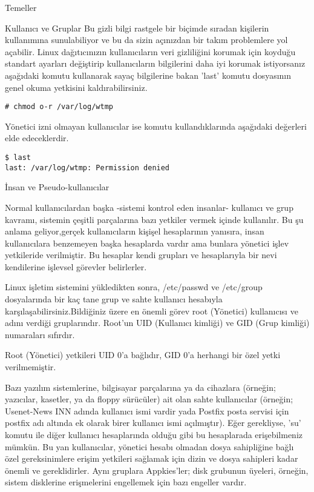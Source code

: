 \begin{section}{Temeller}
\begin{subsection}{Kullanıcı ve Gruplar}
Bu gizli bilgi rastgele bir biçimde sıradan kişilerin kullanımına sunulabiliyor ve bu da sizin açınızdan bir takım problemlere yol açabilir. Linux dağıtıcınızın kullanıcıların veri gizliliğini korumak için koyduğu standart ayarları değiştirip kullanıcıların bilgilerini daha iyi korumak istiyorsanız aşağıdaki komutu kullanarak sayaç bilgilerine bakan 'last' komutu dosyasının genel okuma yetkisini kaldırabilirsiniz.
\begin{verbatim}
# chmod o-r /var/log/wtmp
\end{verbatim}

Yönetici izni olmayan kullanıcılar ise komutu kullandıklarında aşağıdaki değerleri elde edeceklerdir.
\begin{verbatim}
$ last
last: /var/log/wtmp: Permission denied
\end{verbatim}
\end{subsection}
\begin{subsection}{İnsan ve Pseudo-kullanıcılar}

Normal kullanıcılardan başka -sistemi kontrol eden insanlar- kullanıcı ve grup kavramı, sistemin çeşitli parçalarına bazı yetkiler vermek içinde kullanılır. Bu şu anlama geliyor,gerçek kullanıcıların kişişel hesaplarının yanısıra, insan kullanıcılara benzemeyen başka hesaplarda vardır ama bunlara yönetici işlev yetkileride verilmiştir. Bu hesaplar kendi grupları ve hesaplarıyla bir nevi kendilerine işlevsel görevler belirlerler.

Linux işletim sistemini yükledikten sonra, /etc/passwd ve /etc/group dosyalarında bir kaç tane grup ve sahte kullanıcı hesabıyla karşılaşabilirsiniz.Bildiğiniz üzere en önemli görev root (Yönetici) kullanıcısı ve adını verdiği gruplarındır. Root'un UID (Kullanıcı kimliği) ve GID (Grup kimliği) numaraları sıfırdır.

Root (Yönetici) yetkileri UID 0'a bağlıdır, GID 0'a herhangi bir özel yetki verilmemiştir.

Bazı yazılım sistemlerine, bilgisayar parçalarına ya da cihazlara (örneğin; yazıcılar, kasetler, ya da floppy sürücüler) ait olan sahte kullanıcılar (örneğin; Usenet-News INN adında kullanıcı ismi vardir yada Postfix posta servisi için postfix adı altında ek olarak birer kullanıcı ismi açılmıştır). Eğer gerekliyse, 'su' komutu ile diğer kullanıcı hesaplarında olduğu gibi bu hesaplarada erişebilmeniz mümkün. Bu yan kullanıcılar, yönetici hesabı olmadan dosya sahipliğine bağlı özel gereksinimlere erişim yetkileri sağlamak için dizin ve dosya sahipleri kadar önemli ve gereklidirler. Aynı gruplara Appkies'ler; disk grubunun üyeleri, örneğin, sistem disklerine erişmelerini engellemek için bazı engeller vardır.
\end{subsection}

\end{section}
